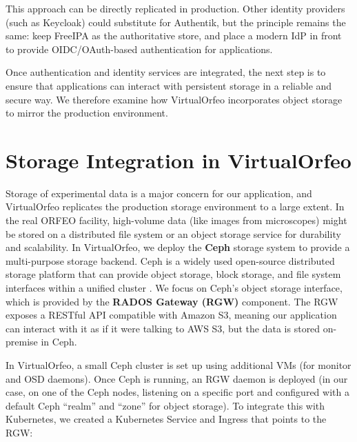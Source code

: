 This approach can be directly replicated in production. Other identity providers (such as Keycloak) could substitute for Authentik, but the principle remains the same: keep FreeIPA as the authoritative store, and place a modern IdP in front to provide OIDC/OAuth-based authentication for applications.

\medskip
\noindent Once authentication and identity services are integrated, 
the next step is to ensure that applications can interact 
with persistent storage in a reliable and secure way. 
We therefore examine how VirtualOrfeo incorporates object storage 
to mirror the production environment.


\section{Storage Integration in VirtualOrfeo} \label{sec:virtualorfeo-storage}

Storage of experimental data is a major concern for our application, and 
VirtualOrfeo replicates the production storage environment to a large extent. In 
the real ORFEO facility, high-volume data (like images from microscopes) might 
be stored on a distributed file system or an object storage service for 
durability and scalability. In VirtualOrfeo, we deploy the \textbf{Ceph} storage 
system to provide a multi-purpose storage backend. Ceph is a widely used 
open-source distributed storage platform that can provide object storage, block 
storage, and file system interfaces within a unified cluster 
\parencite{Weil2006Ceph}. We focus on Ceph’s object storage interface, which is 
provided by the \textbf{RADOS Gateway (RGW)} component. The RGW exposes a 
RESTful API compatible with Amazon S3, meaning our application can interact with 
it as if it were talking to AWS S3, but the data is stored on-premise in Ceph.

\medskip

In VirtualOrfeo, a small Ceph cluster is set up using additional VMs (for monitor 
and OSD daemons). Once Ceph is running, an RGW daemon is deployed (in our case, 
on one of the Ceph nodes, listening on a specific port and configured with a 
default Ceph ``realm'' and ``zone'' for object storage). To integrate this with 
Kubernetes, we created a Kubernetes Service and Ingress that points to the RGW:  

